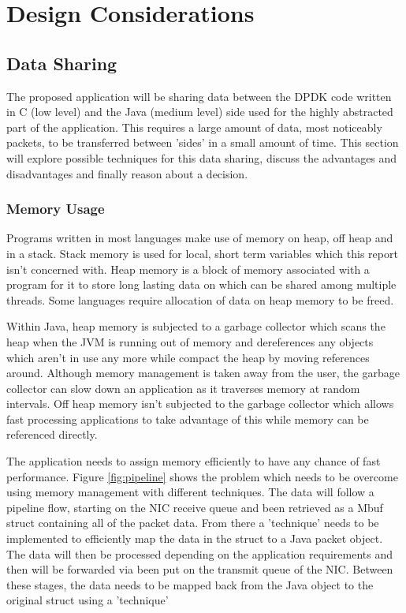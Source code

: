 \documentclass[final_report.tex]{subfiles}
\begin{document}
\section{Design Considerations}
\label{sec:design}

\subsection{Data Sharing}
The proposed application will be sharing data between the DPDK code written in C (low level) and the Java (medium level) side used for the highly abstracted part of the application. This requires a large amount of data, most noticeably packets, to be transferred between 'sides' in a small amount of time. This section will explore possible techniques for this data sharing, discuss the advantages and disadvantages and finally reason about a decision.

\subsubsection{Memory Usage}
Programs written in most languages make use of memory on heap, off heap and in a stack. Stack memory is used for local, short term variables which this report isn't concerned with. Heap memory is a block of memory associated with a program for it to store long lasting data on which can be shared among multiple threads. Some languages require allocation of data on heap memory to be freed.

Within Java, heap memory is subjected to a garbage collector which scans the heap when the JVM is running out of memory and dereferences any objects which aren't in use any more while compact the heap by moving references around. Although memory management is taken away from the user, the garbage collector can slow down an application as it traverses memory at random intervals. Off heap memory isn't subjected to the garbage collector which allows fast processing applications to take advantage of this while memory can be referenced directly.

The application needs to assign memory efficiently to have any chance of fast performance. Figure \ref{fig:pipeline} shows the problem which needs to be overcome using memory management with different techniques. The data will follow a pipeline flow, starting on the NIC receive queue and been retrieved as a Mbuf struct containing all of the packet data. From there a 'technique' needs to be implemented to efficiently map the data in the struct to a Java packet object. The data will then be processed depending on the application requirements and then will be forwarded via been put on the transmit queue of the NIC. Between these stages, the data needs to be mapped back from the Java object to the original struct using a 'technique'
\end{document}
